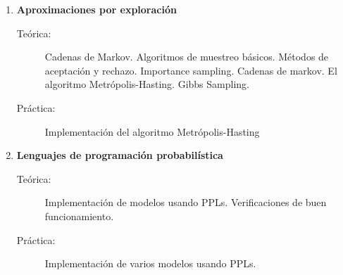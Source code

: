 \documentclass[10pt]{article}
\begin{document}
\begin{enumerate}

\vspace{0.1cm}
\item \textbf{Aproximaciones por exploración}
\vspace{-0.15cm}
\begin{description}
\item[Teórica:] Cadenas de Markov. Algoritmos de muestreo básicos. Métodos de aceptación y rechazo. Importance sampling. Cadenas de markov. El algoritmo Metrópolis-Hasting. Gibbs Sampling.
\item[Práctica:] Implementación del algoritmo Metrópolis-Hasting
\end{description}


\vspace{0.1cm}
\item \textbf{Lenguajes de programación probabilística}
\vspace{-0.15cm}
\begin{description}
\item[Teórica:] Implementación de modelos usando PPLs. Verificaciones de buen funcionamiento. 
\item[Práctica:] Implementación de varios modelos usando PPLs.
\end{description}

\end{enumerate}

\nocite{jaynes1984-bayesianBackground, mcelreath2020-rethinking, bishop2006-PRML, pearl2009-causality, cinelli2021-crashCourse, stan-userGuide, martin2021-BMCP, samaja1999-epistemologiaMetodologia }

{

}
\end{document}
